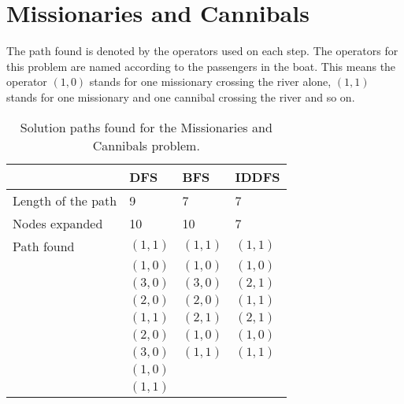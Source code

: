 \section{Missionaries and Cannibals}

The path found is denoted by the operators used on each step.
The operators for this problem are named according to the passengers in the boat.
This means the operator $(1,0)$ stands for one missionary crossing the river alone, $(1,1)$ stands for one missionary and one cannibal crossing the river and so on.


\begin{table}[h]
\centering
\begin{tabular}{|l|l|l|l|}
\hline
	&	DFS	&	BFS	&	IDDFS	\\
\hline
Length of the path	&  9		&  7		& 7			\\
\hline
Nodes expanded		& 10		& 10		& 7			\\
\hline
Path found			& $(1,1)$	& $(1,1)$	& $(1,1)$	\\
					& $(1,0)$	& $(1,0)$	& $(1,0)$	\\
					& $(3,0)$	& $(3,0)$	& $(2,1)$	\\
					& $(2,0)$	& $(2,0)$	& $(1,1)$	\\
					& $(1,1)$	& $(2,1)$	& $(2,1)$	\\
					& $(2,0)$	& $(1,0)$	& $(1,0)$	\\
					& $(3,0)$	& $(1,1)$	& $(1,1)$	\\
					& $(1,0)$	&			&			\\
					& $(1,1)$	&			&			\\
\hline

\end{tabular}
\caption{Solution paths found for the Missionaries and Cannibals problem.}
\end{table}